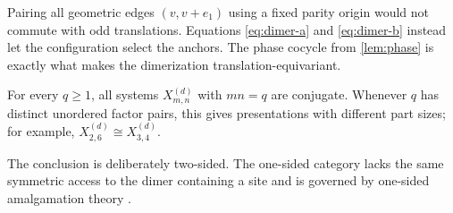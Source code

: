 \begin{remark}
Pairing all geometric edges $(v,v+e_1)$ using a fixed parity origin would not
commute with odd translations.  Equations \eqref{eq:dimer-a} and
\eqref{eq:dimer-b} instead let the configuration select the anchors.  The
phase cocycle from \cref{lem:phase} is exactly what makes the dimerization
translation-equivariant.
\end{remark}

\begin{corollary}\label{cor:many-presentations}
For every $q\geq1$, all systems $X_{m,n}^{(d)}$ with $mn=q$ are conjugate.
Whenever $q$ has distinct unordered factor pairs, this gives presentations
with different part sizes; for example,
$X_{2,6}^{(d)}\cong X_{3,4}^{(d)}$.
\end{corollary}

The conclusion is deliberately two-sided.  The one-sided category lacks the
same symmetric access to the dimer containing a site and is governed by
one-sided amalgamation theory \citep{BealBlockGorman2025}.
